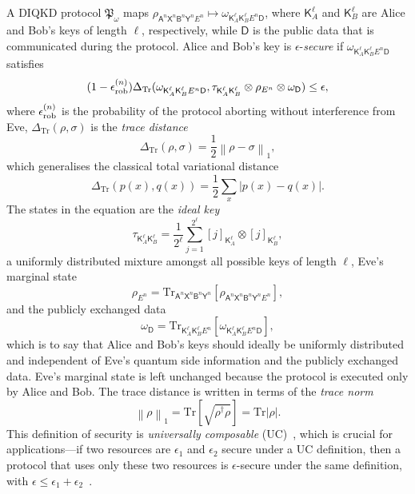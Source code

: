 \documentclass[10pt, a4paper]{article}
\numberwithin{equation}{section} %
\theoremstyle{definition}
\theoremstyle{plain}
\newcommand{\norm}[1]{\left\lVert#1\right\rVert}
\newcommand{\abs}[1]{\left\lvert#1\right\rvert}
\newcommand{\?}{\mathrel{?}} %
\newcommand{\Tr}{\mathrm{Tr}} %
\newcommand{\crv}[1]{\mathsf{#1}}
\newcommand{\proj}[2][]{{[#2]}_{#1}}
\newcommand{\rob}{\rm rob}
\newcommand{\erob}[1]{\epsilon_{\rob}^{(#1)}}
\begin{document}
    A DIQKD protocol \(\mathfrak{P}_{\omega}\) maps \(\rho_{\crv{A}^n\crv{X}^n \crv{B}^n\crv{Y}^n E^n} \mapsto \omega_{\crv{K}_{A}^{\ell} \crv{K}_{B}^{\ell} E^n \crv{D}}\), where \(\crv{K}_{A}^{\ell}\) and \(\crv{K}_{B}^{\ell}\) are Alice and Bob's keys of length \(\ell\), respectively, while \(\crv{D}\) is the public data that is communicated during the protocol. Alice and Bob's key is \(\epsilon\)-\emph{secure} if \(\omega_{\crv{K}_{A}^{\ell} \crv{K}_{B}^{\ell} E^n \crv{D}}\) satisfies~\cite{SecurityQKD}
    \begin{equation}
      (1-\erob{n})\Delta_{\Tr}(\omega_{\crv{K}_{A}^{\ell} \crv{K}_{B}^{\ell} E^n \crv{D}}, \tau_{\crv{K}_{A}^{\ell} \crv{K}_{B}^{\ell}} \otimes \rho_{E^n} \otimes \omega_{\crv{D}}) \leq \epsilon,
    \end{equation}
    where \(\erob{n}\) is the probability of the protocol aborting without interference from Eve, \(\Delta_{\Tr}(\rho,\sigma)\) is the \emph{trace distance}
    \begin{equation}
      \Delta_{\Tr}(\rho, \sigma) = \frac{1}{2}\norm{\rho - \sigma}_1,
    \end{equation}
    which generalises the classical total variational distance
    \[ \Delta_{\Tr}(p(x),q(x)) = \frac{1}{2} \sum_{x} \abs{p(x)-q(x)}. \]
    The states in the equation are the \emph{ideal key}
    \begin{equation}
      \tau_{\crv{K}_{A}^{\ell} \crv{K}_{B}^{\ell}} = \frac{1}{2^{\ell}} \sum_{j=1}^{2^{\ell}} \proj[\crv{K}_{A}^{\ell}]{j} \otimes \proj[\crv{K}_{B}^{\ell}]{j},
    \end{equation}
    a uniformly distributed mixture amongst all possible keys of length \(\ell\), Eve's marginal state
    \begin{equation}
      \rho_{E^n} = \Tr_{\crv{A}^n\crv{X}^n \crv{B}^n\crv{Y}^n}\left[ \rho_{\crv{A}^n\crv{X}^n \crv{B}^n\crv{Y}^n E^n} \right],
    \end{equation}
    and the publicly exchanged data
    \begin{equation}
      \omega_{\crv{D}} = \Tr_{\crv{K}_{A}^{\ell} \crv{K}_{B}^{\ell} E^n}\left[ \omega_{\crv{K}_{A}^{\ell} \crv{K}_{B}^{\ell} E^n \crv{D}} \right],
    \end{equation} 
    which is to say that Alice and Bob's keys should ideally be uniformly distributed and independent of Eve's quantum side information and the publicly exchanged data. Eve's marginal state is left unchanged because the protocol is executed only by Alice and Bob. The trace distance is written in terms of the \emph{trace norm}
    \begin{equation}
      \norm{\rho}_1 = \Tr\left[ \sqrt{\rho^{\dagger}\rho} \right] = \Tr\abs{\rho}.
    \end{equation}
    This definition of security is \emph{universally composable} (UC)~\cite{CQKeyDistill}, which is crucial for applications---if two resources are \(\epsilon_1\) and \(\epsilon_2\) secure under a UC definition, then a protocol that uses only these two resources is \(\epsilon\)-secure under the same definition, with \(\epsilon \leq \epsilon_1 + \epsilon_2\)~\cite{SecurityQKD}.
\end{document}
